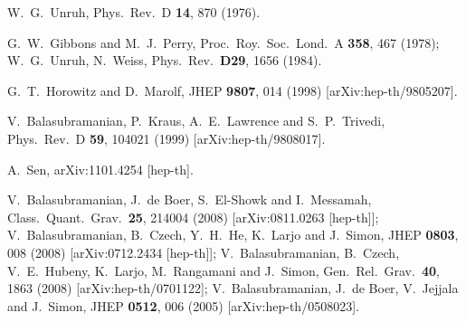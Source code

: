 \documentclass[12pt]{article}
\begin{document}
\begin{thebibliography}{10}
  W.~G.~Unruh,
  Phys.\ Rev.\  D {\bf 14}, 870 (1976).


G.~W.~Gibbons and M.~J.~Perry,
  Proc.\ Roy.\ Soc.\ Lond.\  A {\bf 358}, 467 (1978);
W.~G.~Unruh, N.~Weiss,
  Phys.\ Rev.\  {\bf D29}, 1656 (1984).
  
  G.~T.~Horowitz and D.~Marolf,
  JHEP {\bf 9807}, 014 (1998)
  [arXiv:hep-th/9805207].

  V.~Balasubramanian, P.~Kraus, A.~E.~Lawrence and S.~P.~Trivedi,
  Phys.\ Rev.\  D {\bf 59}, 104021 (1999)
  [arXiv:hep-th/9808017].



  A.~Sen,
  arXiv:1101.4254 [hep-th].




  V.~Balasubramanian, J.~de Boer, S.~El-Showk and I.~Messamah,
  Class.\ Quant.\ Grav.\  {\bf 25}, 214004 (2008)
  [arXiv:0811.0263 [hep-th]];
  V.~Balasubramanian, B.~Czech, Y.~H.~He, K.~Larjo and J.~Simon,
  JHEP {\bf 0803}, 008 (2008)
  [arXiv:0712.2434 [hep-th]];
  V.~Balasubramanian, B.~Czech, V.~E.~Hubeny, K.~Larjo, M.~Rangamani and J.~Simon,
  Gen.\ Rel.\ Grav.\  {\bf 40}, 1863 (2008)
  [arXiv:hep-th/0701122];
  V.~Balasubramanian, J.~de Boer, V.~Jejjala and J.~Simon,
  JHEP {\bf 0512}, 006 (2005)
  [arXiv:hep-th/0508023].
  
  



\end{thebibliography}
\end{document}
